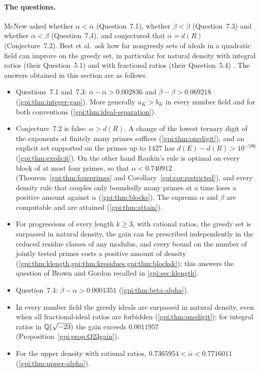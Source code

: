 \paragraph{The questions.}
McNew \cite[Section~7]{McNew2015Sets} asked whether $\alpha<\overline\alpha$ (Question~7.1),
whether $\beta<\overline\beta$ (Question~7.3) and whether $\alpha<\beta$ (Question~7.4), and
conjectured that $\alpha=d(R)$ (Conjecture~7.2). Best et al.\ ask how far nongreedy sets of
ideals in a quadratic field can improve on the greedy set, in particular for natural density
with integral ratios (their Question~5.1) and with fractional ratios (their Question~5.4)
\cite[Section~5]{Best2017Geometric}. The answers obtained in this section are as follows.
\begin{itemize}
\item Questions~7.1 and~7.3: $\overline\alpha-\alpha>0.002836$ and
 $\overline\beta-\beta>0.069218$ (\cref{gpi:thm:integer-gap}). More generally $u_K>b_K$ in
 every number field and for both conventions (\cref{gpi:thm:ideal-separation}).
\item Conjecture~7.2 is false: $\alpha>d(R)$. A change of the lowest ternary digit of the
 exponents at finitely many primes suffices (\cref{gpi:thm:onedigit}), and an explicit set
 supported on the primes up to $1427$ has $d(E)-d(R)>10^{-596}$ (\cref{gpi:thm:explicit}).
 On the other hand Rankin's rule is optimal on every block of at most four primes, so that
 $\alpha<0.740912$ (Theorem~\ref{gpi:thm:fourprimes} and Corollary~\ref{gpi:cor:restricted}), and every density rule that
 couples only boundedly many primes at a time loses a positive amount against $\alpha$
 (\cref{gpi:thm:blocks}). The suprema $\alpha$ and $\beta$ are computable and are attained
 (\cref{gpi:thm:attain}).
\item For progressions of every length $k\ge3$, with rational ratios, the greedy set is surpassed
 in natural density, the gain can be prescribed independently in the reduced residue classes of any
 modulus, and every bound on the number of jointly tested primes costs a positive amount of density
 (\cref{gpi:thm:klength,gpi:thm:kresidues,gpi:thm:blocksk}); this answers the question of Brown and
 Gordon \cite{BrownGordon1996Sequences} recalled in \cref{gpi:sec:klength}.
\item Question~7.4: $\beta-\alpha>0.0001351$ (\cref{gpi:thm:beta-alpha}).
\item In every number field the greedy ideals are surpassed in natural density, even when all
 fractional-ideal ratios are forbidden (\cref{gpi:thm:onedigit}); for integral ratios in
 $\mathbb{Q}(\sqrt{-23})$ the gain exceeds $0.0011957$ (Proposition~\ref{gpi:prop:Q23gain}).
\item For the upper density with rational ratios, $0.7365954<\overline\alpha<0.7716011$
 (\cref{gpi:thm:upper-alpha}).
\end{itemize}
